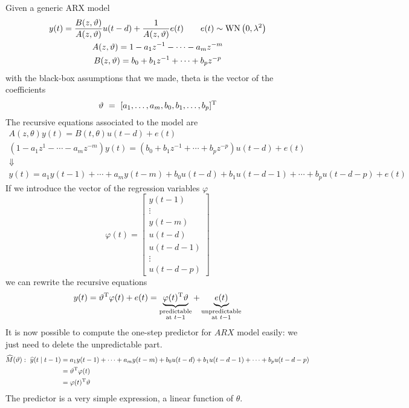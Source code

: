 Given a generic ARX model
\begin{gather*}
y(t) =\frac{B(z,\vartheta)}{A(z,\vartheta)} u(t-d) +\frac{1}{A(z,\vartheta)} e(t) \qquad e(t) \sim \operatorname{WN}\left(0,\lambda ^{2}\right)\\
A(z,\vartheta) =1-a_{1} z^{-1} -\cdots -a_{m} z^{-m}\\
B(z,\vartheta) =b_{0} +b_{1} z^{-1} +\cdots +b_{p} z^{-p}
\end{gather*}
with the black-box assumptions that we made, theta is the vector of the coefficients
\begin{equation*}
\vartheta \ =\ [ a_{1},\ldots,a_{m},b_{0},b_{1},\ldots,b_{p}]^{\mathrm{T}}
\end{equation*}
The recursive equations associated to the model are
\begin{gather*}
A(z,\theta) y(t) =B(t,\theta) u(t-d) +e(t)\\
\left(1-a_{1} z^{1} -\cdots -a_{m} z^{-m}\right) y(t) =\left(b_{0} +b_{1} z^{-1} +\cdots +b_{p} z^{-p}\right) u(t-d) +e(t)\\
\Downarrow \\
y(t) =a_{1} y(t-1) +\cdots +a_{m} y(t-m) +b_{0} u(t-d) +b_{1} u(t-d-1) +\cdots +b_{p} u(t-d-p) +e(t)
\end{gather*}
If we introduce the vector of the regression variables $ \varphi $
\begin{equation*}
\varphi (t) =\begin{bmatrix}
y(t-1)\\
\vdots\\
y(t-m)\\
u(t-d)\\
u(t-d-1)\\
\vdots\\
u(t-d-p)
\end{bmatrix}
\end{equation*}
we can rewrite the recursive equations
\begin{equation*}
	y(t) =\vartheta ^{\mathrm{T}} \varphi (t) +e(t) =\underbrace{\varphi (t)^{\mathrm{T}} \vartheta }_{\substack{\text{predictable}\\\text{at }t-1}} +\underbrace{e(t)}_{\substack{\text{unpredictable}\\\text{at }t-1}}
\end{equation*}
It is now possible to compute the one-step predictor for $ ARX$ model easily: we just need to delete the unpredictable part.
\begin{align*}
\widehat{M}(\vartheta) :\ \widehat{y}(t\mid t-1) & =a_{1} y(t-1) +\cdots +a_{m} y(t-m) +b_{0} u(t-d) +b_{1} u(t-d-1) +\cdots +b_{p} u(t-d-p)\\
 & =\vartheta ^{\mathrm{T}} \varphi (t) \ \\
 & =\varphi (t)^{\mathrm{T}} \vartheta 
\end{align*}
The predictor is a very simple expression, a linear function of $ \theta $.

